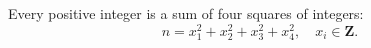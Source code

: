 Every positive integer is a sum of four squares of integers:
$$
n = x_1^2 + x_2^2 + x_3^2 + x_4^2, \quad x_i \in \mathbf{Z}.
$$
